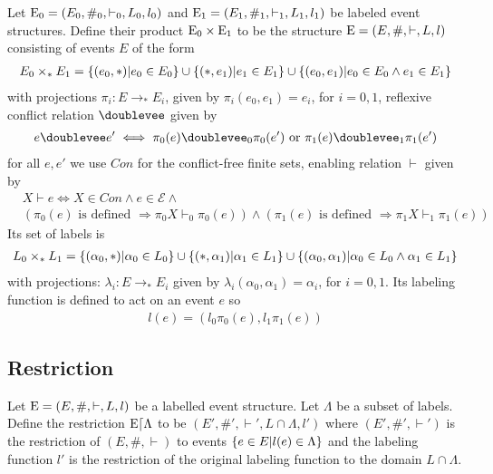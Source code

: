 \begin{definition}
    Let $\mathrm{E_0} = (E_0,\#_0,\vdash_0,L_0,l_0)$ and
    $\mathrm{E_1} = (E_1,\#_1,\vdash_1,L_1,l_1)$
    be labeled event structures.
    Define their product $\mathrm{E_0} \times \mathrm{E_1}$ to be the structure $\mathrm{E} = (E,\#,\vdash,L,l)$
    consisting of events $E$ of the form
    \begin{align*}
        E_0 \times_* E_1 =
        \{(e_0,*)|e_0 \in E_0\}
        \cup \{(*,e_1)|e_1 \in E_1\}
        \cup \{(e_0,e_1)| e_0 \in E_0 \wedge e_1 \in E_1\}
    \end{align*}
    with projections $\pi_i : E \rightarrow_* E_i$,
    given by $\pi_i(e_0,e_1) = e_i$, for $i=0,1$, reflexive conflict relation $\doublevee$ given by
    \begin{align*}
        e \doublevee e' \iff \pi_0(e) \doublevee_0 \pi_0(e') \text{ or }
        \pi_1(e) \doublevee_1 \pi_1(e')
    \end{align*}
    for all $e,e'$ we use $Con$ for the conflict-free finite sets,
    enabling relation $\vdash$ given by
    \begin{align*}
         & X \vdash e \iff X \in Con \wedge e \in \mathcal{E} \wedge        \\
         & (\pi_0(e)\text{ is defined } \Rightarrow \pi_0X\vdash_0\pi_0(e))
        \wedge (\pi_1(e)\text{ is defined } \Rightarrow \pi_1X\vdash_1\pi_1(e))
    \end{align*}
    Its set of labels is
    \begin{align*}
        L_0 \times_* L_1 = \{ (\alpha_0,*)|\alpha_0 \in L_0\}
        \cup \{(*,\alpha_1)|\alpha_1 \in L_1\}
        \cup \{(\alpha_0,\alpha_1)|\alpha_0 \in L_0 \wedge \alpha_1 \in L_1\}
    \end{align*}
    with projections: $\lambda_i: E \rightarrow_* E_i$ given by
    $\lambda_i(\alpha_0,\alpha_1) = \alpha_i$, for $i=0,1$.
    Its labeling function is defined to act on an event $e$ so
    \begin{align*}
        l(e) = (l_0\pi_0(e),l_1\pi_1(e))
    \end{align*}
\end{definition}

\subsection{Restriction}

\begin{definition}

    Let $\mathrm{E} = (E,\#,\vdash,L,l)$ be a labelled event structure.
    Let $\Lambda$ be a subset of labels.
    Define the restriction $\mathrm{E}\lceil \Lambda$ to be $(E',\#',\vdash',L\cap \Lambda,l')$
    where $(E',\#',\vdash')$ is the restriction of $(E,\#,\vdash)$
    to events $\{e \in E|l(e) \in \Lambda\}$ and the labeling function $l'$
    is the restriction of the original labeling function to the domain $L \cap \Lambda$.
\end{definition}

